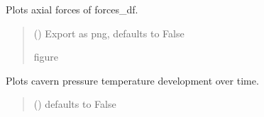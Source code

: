 \documentclass[letterpaper,10pt,english]{sphinxmanual}
\begin{document}
\begin{fulllineitems}
\begin{fulllineitems}
\label{\detokenize{tscw_module:tscw_module.tscw_DataClassesOutput.TSCW_TBHC.plot_axial_forces}}
\pysigstartsignatures
{}
\pysigstopsignatures
\sphinxAtStartPar
Plots axial forces of forces\_df.
\begin{quote}\begin{description}
\sphinxAtStartPar
{} (\sphinxstyleliteralemphasis{\sphinxupquote{, }}) \textendash{} Export as png, defaults to False

\sphinxAtStartPar
figure

\end{description}\end{quote}

\end{fulllineitems}


\begin{fulllineitems}
\label{\detokenize{tscw_module:tscw_module.tscw_DataClassesOutput.TSCW_TBHC.plot_cavern_pt_development}}
\pysigstartsignatures
{}
\pysigstopsignatures
\sphinxAtStartPar
Plots cavern pressure \sphinxhyphen{} temperature development over time.
\begin{quote}\begin{description}
\sphinxAtStartPar
{} (\sphinxstyleliteralemphasis{\sphinxupquote{, }}) \textendash{} defaults to False

\end{description}\end{quote}

\end{fulllineitems}


\end{fulllineitems}
\end{document}
